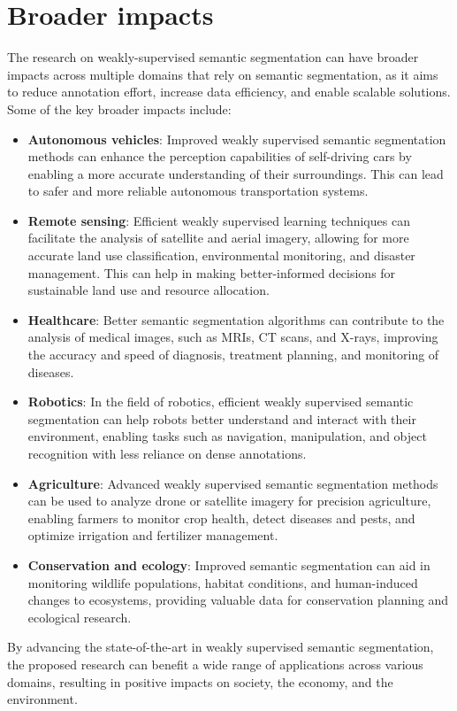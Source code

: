 \documentclass[11pt]{article}
\begin{document}
\section{Broader impacts}
The research on weakly-supervised semantic segmentation can have broader impacts across multiple domains that rely on semantic segmentation, as it aims to reduce annotation effort, increase data efficiency, and enable scalable solutions. Some of the key broader impacts include:
\begin{itemize}
    \item \textbf{Autonomous vehicles}: Improved weakly supervised semantic segmentation methods can enhance the perception capabilities of self-driving cars by enabling a more accurate understanding of their surroundings. This can lead to safer and more reliable autonomous transportation systems.
    \item \textbf{Remote sensing}: Efficient weakly supervised learning techniques can facilitate the analysis of satellite and aerial imagery, allowing for more accurate land use classification, environmental monitoring, and disaster management. This can help in making better-informed decisions for sustainable land use and resource allocation.
     \item \textbf{Healthcare}: Better semantic segmentation algorithms can contribute to the analysis of medical images, such as MRIs, CT scans, and X-rays, improving the accuracy and speed of diagnosis, treatment planning, and monitoring of diseases.
    \item \textbf{Robotics}: In the field of robotics, efficient weakly supervised semantic segmentation can help robots better understand and interact with their environment, enabling tasks such as navigation, manipulation, and object recognition with less reliance on dense annotations.
    \item \textbf{Agriculture}: Advanced weakly supervised semantic segmentation methods can be used to analyze drone or satellite imagery for precision agriculture, enabling farmers to monitor crop health, detect diseases and pests, and optimize irrigation and fertilizer management.
    \item \textbf{Conservation and ecology}: Improved semantic segmentation can aid in monitoring wildlife populations, habitat conditions, and human-induced changes to ecosystems, providing valuable data for conservation planning and ecological research.
    
\end{itemize}
By advancing the state-of-the-art in weakly supervised semantic segmentation, the proposed research can benefit a wide range of applications across various domains, resulting in positive impacts on society, the economy, and the environment.
\end{document}
